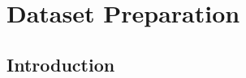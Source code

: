 \chapter{Dataset Preparation }
\label{ch:chapter04}
 
%
%
\section{Introduction}
\label{sec:chapter05:intro}


